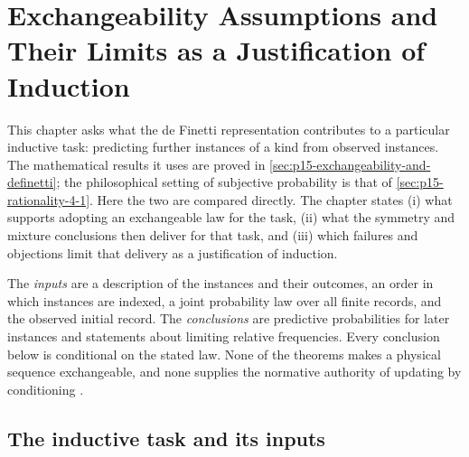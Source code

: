 \chapter{Exchangeability Assumptions and Their Limits as a Justification of Induction}
\label{sec:p15-w02b-p15-022}

This chapter asks what the de Finetti representation contributes to a
particular inductive task: predicting further instances of a kind from
observed instances. The mathematical results it uses are proved in
\cref{sec:p15-exchangeability-and-definetti}; the philosophical setting of
subjective probability is that of \cref{sec:p15-rationality-4-1}. Here the
two are compared directly. The chapter states (i) what supports adopting an
exchangeable law for the task, (ii) what the symmetry and mixture
conclusions then deliver for that task, and (iii) which failures and
objections limit that delivery as a justification of induction.

The \emph{inputs} are a description of the instances and their outcomes,
an order in which instances are indexed, a joint probability law over all
finite records, and the observed initial record. The \emph{conclusions}
are predictive probabilities for later instances and statements about
limiting relative frequencies. Every conclusion below is conditional on the
stated law. None of the theorems makes a physical sequence exchangeable,
and none supplies the normative authority of updating by conditioning
\cite[pp.~249--255]{DurrettPTEAuthor2019}.

\section{The inductive task and its inputs}
\label{sec:p15-w02b-p15-022-task}


